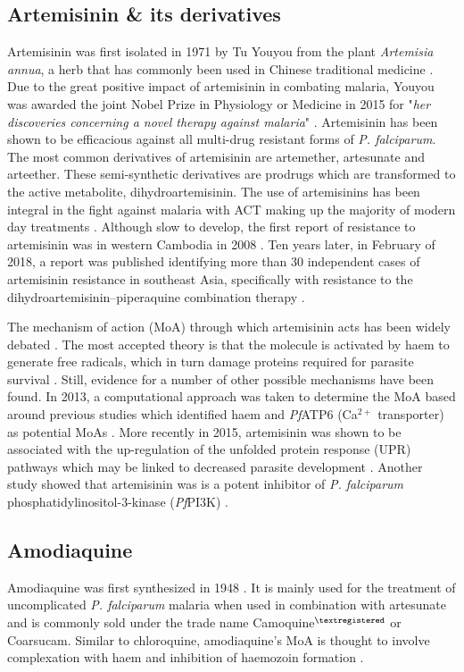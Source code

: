 \documentclass[twocolumn]{bmcart}%
\begin{document}
\subsection*{Artemisinin \& its derivatives}
Artemisinin was first isolated in 1971 by Tu Youyou from the plant \textit{Artemisia annua}, a herb that has commonly been used in Chinese traditional medicine \cite{Qinghaosu1979}. Due to the great positive impact of artemisinin in combating malaria, Youyou was awarded the joint Nobel Prize in Physiology or Medicine in 2015 for "\textit{her discoveries concerning a novel therapy against malaria}" \cite{Nobelprize2015}. Artemisinin has been shown to be efficacious against all multi-drug resistant forms of \textit{P. falciparum}. The most common derivatives of artemisinin are artemether, artesunate and arteether. These semi-synthetic derivatives are prodrugs which are transformed to the active metabolite, dihydroartemisinin. The use of artemisinins has been integral in the fight against malaria with ACT making up the majority of modern day treatments \cite{Eastman2009}. Although slow to develop, the first report of resistance to artemisinin was in western Cambodia in 2008 \cite{Noedl2008}. Ten years later, in February of 2018, a report was published identifying more than 30 independent cases of artemisinin resistance in southeast Asia, specifically with resistance to the dihydroartemisinin--piperaquine combination therapy \cite{Amato2018}.

The mechanism of action (MoA) through which artemisinin acts has been widely debated \cite{ONeill2010}. The most accepted theory is that the molecule is activated by haem to generate free radicals, which in turn damage proteins required for parasite survival \cite{Wang2015,Tilley2016}. Still, evidence for a number of other possible mechanisms have been found. In 2013, a computational approach was taken to determine the MoA based around previous studies which identified haem and \textit{Pf}ATP6 (Ca$^{2+}$ transporter) as potential MoAs \cite{Shandilya2013}. More recently in 2015, artemisinin was shown to be associated with the up-regulation of the unfolded protein response (UPR) pathways which may be linked to decreased parasite development \cite{Mok2014}. Another study showed that artemisinin was is a potent inhibitor of \textit{P. falciparum} phosphatidylinositol-3-kinase (\textit{Pf}PI3K) \cite{Mbengue2015}.

\subsection*{Amodiaquine}
Amodiaquine was first synthesized in 1948 \cite{Berliner1948}. It is mainly used for the treatment of uncomplicated \textit{P. falciparum} malaria when used in combination with artesunate and is commonly sold under the trade name Camoquine$^{\scriptsize{\textregistered}}$ or Coarsucam\texttrademark \cite{Bompart2011}. Similar to chloroquine, amodiaquine's MoA is thought to involve complexation with haem and inhibition of haemozoin formation \cite{Combrinck2012}.
\end{document}
